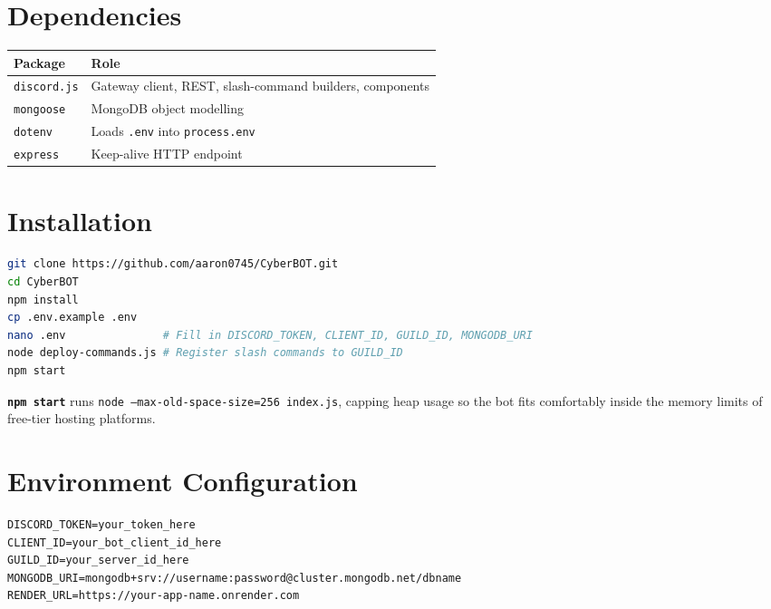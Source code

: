 \documentclass[12pt,a4paper]{report}
\newcommand{\cmd}[1]{\texttt{\color{cybercyan}\textbf{#1}}}
\newcommand{\file}[1]{\texttt{\color{cyberpurple!80!black}#1}}
\newcommand{\note}[1]{
    \begin{tcolorbox}[colback=cyberblue!5, colframe=cyberblue,
        title=\textbf{NOTE}, fonttitle=\sffamily\small]
    #1
    \end{tcolorbox}
}
\begin{document}
\section{Dependencies}

\begin{center}
\begin{tabular}{l l}
\toprule
\textbf{Package} & \textbf{Role} \\
\midrule
\texttt{discord.js} & Gateway client, REST, slash-command builders, components \\
\texttt{mongoose}   & MongoDB object modelling \\
\texttt{dotenv}      & Loads \file{.env} into \texttt{process.env} \\
\texttt{express}     & Keep-alive HTTP endpoint \\
\bottomrule
\end{tabular}
\end{center}

\section{Installation}

\begin{lstlisting}[language=bash, caption=Standard Deployment]
git clone https://github.com/aaron0745/CyberBOT.git
cd CyberBOT
npm install
cp .env.example .env
nano .env               # Fill in DISCORD_TOKEN, CLIENT_ID, GUILD_ID, MONGODB_URI
node deploy-commands.js # Register slash commands to GUILD_ID
npm start
\end{lstlisting}

\note{
    \cmd{npm start} runs \texttt{node --max-old-space-size=256 index.js}, capping heap usage so the
    bot fits comfortably inside the memory limits of free-tier hosting platforms.
}

\section{Environment Configuration}

\begin{tcolorbox}[colback=codebg, colframe=cybergold!60]
\begin{verbatim}
DISCORD_TOKEN=your_token_here
CLIENT_ID=your_bot_client_id_here
GUILD_ID=your_server_id_here
MONGODB_URI=mongodb+srv://username:password@cluster.mongodb.net/dbname
RENDER_URL=https://your-app-name.onrender.com
\end{verbatim}
\end{tcolorbox}
\end{document}
